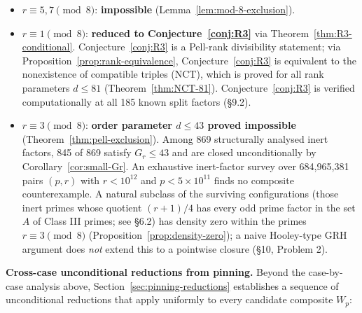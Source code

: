 \documentclass[12pt]{article}
\theoremstyle{plain}
\theoremstyle{definition}
\theoremstyle{remark}
\begin{document}
\begin{itemize}
\item \(r \equiv 5, 7 \pmod{8}\): \textbf{impossible} (Lemma~\ref{lem:mod-8-exclusion}).
\item \(r \equiv 1 \pmod{8}\): \textbf{reduced to Conjecture~\ref{conj:R3}} via Theorem~\ref{thm:R3-conditional}.
  Conjecture~\ref{conj:R3} is a Pell-rank divisibility statement; via
  Proposition~\ref{prop:rank-equivalence}, Conjecture~\ref{conj:R3} is equivalent to the nonexistence of
  compatible triples (NCT), which is proved for all rank
  parameters \(d \leq 81\) (Theorem~\ref{thm:NCT-81}).
  Conjecture~\ref{conj:R3} is verified computationally at all 185
  known split factors (\S9.2).
\item \(r \equiv 3 \pmod{8}\): \textbf{order parameter \(d \leq 43\) proved
  impossible} (Theorem~\ref{thm:pell-exclusion}). Among 869 structurally analysed
  inert factors, 845 of 869 satisfy \(G_r \le 43\) and are closed
  unconditionally by Corollary~\ref{cor:small-Gr}. An exhaustive inert-factor
  survey over 684{,}965{,}381 pairs \((p,r)\) with
  \(r < 10^{12}\) and \(p < 5 \times 10^{11}\) finds no composite
  counterexample. A natural subclass of the surviving
  configurations (those inert primes whose quotient \((r+1)/4\)
  has every odd prime factor in the set \(A\) of Class III primes;
  see \S6.2) has density zero within the primes
  \(r \equiv 3 \pmod{8}\) (Proposition~\ref{prop:density-zero}); a naive Hooley-type
  GRH argument does \emph{not} extend this to a pointwise closure
  (\S10, Problem 2).
\end{itemize}

\textbf{Cross-case unconditional reductions from pinning.} Beyond the
case-by-case analysis above, Section~\ref{sec:pinning-reductions}
establishes a sequence of unconditional reductions that apply
uniformly to every candidate composite \(W_p\):
\end{document}

